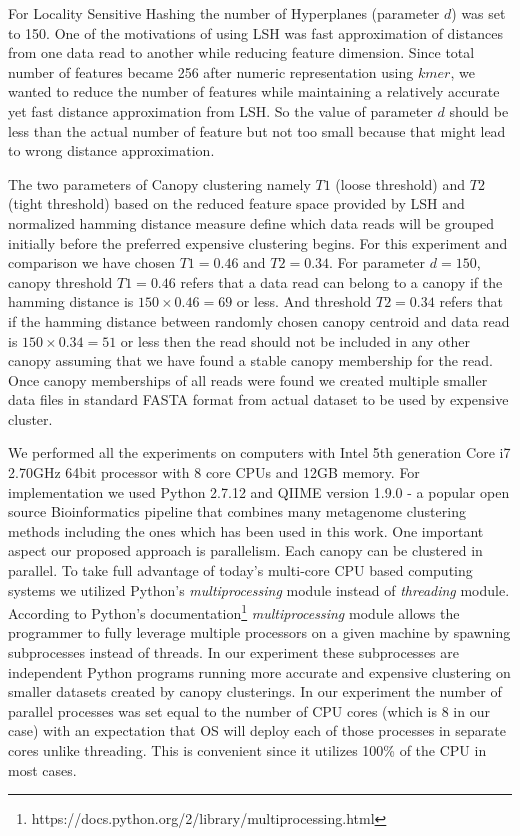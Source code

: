 \documentclass[10pt, conference, compsocconf]{IEEEtran}
\begin{document}
For Locality Sensitive Hashing the number of Hyperplanes (parameter $d$) was set to 150. One of the motivations of using LSH was fast approximation of distances from one data read to another while reducing feature dimension. Since total number of features became 256 after numeric representation using $kmer$, we wanted to reduce the number of features while maintaining a relatively accurate yet fast distance approximation from LSH. So the value of parameter $d$ should be less than the actual number of feature but not too small because that might lead to wrong distance approximation.

The two parameters of Canopy clustering namely $T1$ (loose threshold) and $T2$ (tight threshold) based on the reduced feature space provided by LSH and normalized hamming distance measure define which data reads will be grouped initially before the preferred expensive clustering begins. For this experiment and comparison we have chosen $T1=0.46$ and $T2=0.34$. For parameter $d=150$, canopy threshold $T1=0.46$ refers that a data read can belong to a canopy if the hamming distance is $150\times0.46=69$ or less. And threshold $T2=0.34$ refers that if the hamming distance between randomly chosen canopy centroid and data read is $150\times0.34=51$ or less then the read should not be included in any other canopy assuming that we have found a stable canopy membership for the read. Once canopy memberships of all reads were found we created multiple smaller data files in standard FASTA format from actual dataset to be used by expensive cluster.          

We performed all the experiments on computers with Intel 5th generation Core i7 2.70GHz 64bit processor with 8 core CPUs and 12GB memory. For implementation we used Python 2.7.12 and QIIME \cite{MARQiime} version 1.9.0 - a popular open source Bioinformatics pipeline that combines many metagenome clustering methods including the ones which has been used in this work. One important aspect our proposed approach is parallelism. Each canopy can be clustered in parallel. To take full advantage of today's multi-core CPU based computing systems we utilized Python's \textit{multiprocessing} module instead of \textit{threading} module. According to Python's documentation\footnote{https://docs.python.org/2/library/multiprocessing.html} \textit{multiprocessing} module allows the programmer to fully leverage multiple processors on a given machine by spawning subprocesses instead of threads. In our experiment these subprocesses are independent Python programs running more accurate and expensive clustering on smaller datasets created by canopy clusterings. In our experiment the number of parallel processes was set equal to the number of CPU cores (which is 8 in our case) with an expectation that OS will deploy each of those processes in separate cores unlike threading. This is convenient since it utilizes 100\% of the CPU in most cases. 
\end{document}
